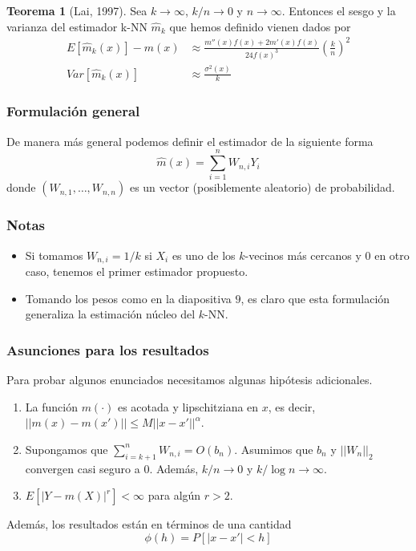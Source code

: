 \documentclass{beamer}
\theoremstyle{definition}
\newtheorem{teorema}{Teorema}
\begin{document}
\begin{frame}
\begin{teorema}[Lai, 1997] 
Sea $k\to \infty$, $k/n\to 0$ y $n\to \infty$. Entonces el sesgo y la varianza del estimador k-NN $\hat{m}_k$ que hemos definido vienen dados por
\begin{align*}
E[\hat{m}_k(x)]-m(x) &\approx \frac{m''(x)f(x)+2m'(x)f(x)}{24f(x)^3}\left(\frac{k}{n}\right)^2\\
Var[\hat{m}_k(x)] &\approx \frac{\sigma^2(x)}{k}
\end{align*}

\end{teorema}
\end{frame}


\begin{frame}
\frametitle{Formulación general}
De manera más general podemos definir el estimador de la siguiente forma
$$
\hat{m}(x)=\sum_{i=1}^n W_{n,i} Y_i
$$
donde $(W_{n,1},\dotsc,W_{n,n})$ es un vector (posiblemente aleatorio) de probabilidad. 
\end{frame}

\begin{frame}
\frametitle{Notas}
\begin{itemize}
\item Si tomamos $W_{n,i} = 1/k$ si $X_i$ es uno de los $k$-vecinos más cercanos y $0$ en otro caso, tenemos el primer estimador propuesto.
\item Tomando los pesos como en la diapositiva $9$, es claro que esta formulación generaliza la estimación núcleo del $k$-NN.
\end{itemize}
\end{frame}
\begin{frame}
\frametitle{Asunciones para los resultados}
Para probar algunos enunciados necesitamos algunas hipótesis adicionales.
\begin{enumerate}
\item La función $m(\cdot)$ es acotada y lipschitziana en $x$, es decir, $||m(x)-m(x')|| \leq M||x-x'||^\alpha$.
\item Supongamos que $\sum_{i=k+1}^n W_{n,i} = O(b_n)$. Asumimos que $b_n$ y $||W_n||_2$ convergen casi seguro a $0$. Además, $k/n\to 0$ y $k/\log n \to \infty$. 
\item $E[|Y-m(X)|^r]<\infty$ para algún $r>2$.
\end{enumerate}
Además, los resultados están en términos de una cantidad 
$$
\phi(h) = P[|x-x'|<h]
$$
\end{frame}
\end{document}
